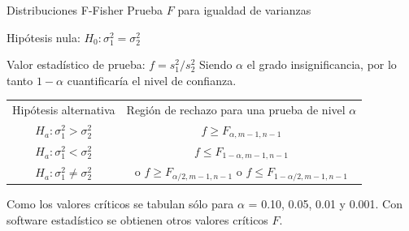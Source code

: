 \documentclass[11pt]{beamer}
\begin{document}
         \begin{frame}{Distribuciones F-Fisher}
           Prueba $F$ para igualdad de varianzas

           Hipótesis nula: $H_0: \sigma^2_1 = \sigma^2_2$

           Valor estadístico de prueba: $f = s^2_1/s^2_2$
           Siendo $\alpha$ el grado insignificancia, por lo tanto $1 -\alpha$ cuantificaría el nivel de confianza.

           \vspace{1px}
           \begin{center}
             \begin{tabular}{cc}
                 Hipótesis alternativa          &   Región de rechazo para una prueba de nivel $\alpha$\\
                 $H_a: \sigma^2_1 > \sigma^2_2$ & $f \geq F_{\alpha,m-1,n-1}$ \\
                 $H_a: \sigma^2_1 < \sigma^2_2$ & $f \leq F_{1-\alpha,m-1,n-1}$ \\
                 $H_a: \sigma^2_1 \neq \sigma^2_2$ & o $f \geq F_{\alpha/2,m-1,n-1}$ o $f \leq F_{1-\alpha/2,m-1,n-1}$ \\
             \end{tabular}
           \end{center}

           \vspace{1px}

           Como los valores críticos se tabulan sólo para $\alpha$ = 0.10, 0.05, 0.01 y 0.001. Con software estadístico se obtienen otros valores críticos $F$.
       \end{frame}
\end{document}
